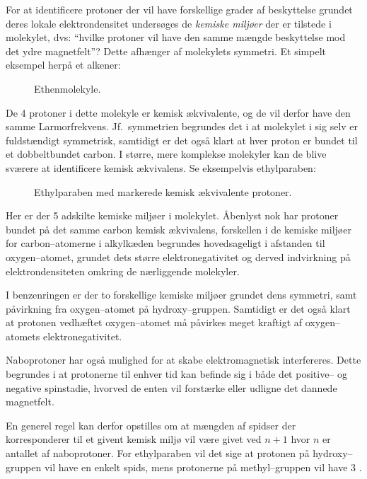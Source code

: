     For at identificere protoner der vil have forskellige grader af beskyttelse grundet deres lokale elektrondensitet undersøges de \textit{kemiske miljøer} der er tilstede i molekylet, dvs: ``hvilke protoner vil have den samme mængde beskyttelse mod det ydre magnetfelt''? Dette afhænger af molekylets symmetri. Et simpelt eksempel herpå et alkener:
    \begin{figure}[H]\centering
        \caption{Ethenmolekyle.}
    \end{figure}
    De 4 protoner i dette molekyle er kemisk ækvivalente, og de vil derfor have den samme Larmorfrekvens. Jf.\ symmetrien begrundes det i at molekylet i sig selv er fuldstændigt symmetrisk, samtidigt er det også klart at hver proton er bundet til et dobbeltbundet carbon. I større, mere komplekse molekyler kan de blive sværere at identificere kemisk ækvivalens. Se eksempelvis ethylparaben:
    \begin{figure}[H]\centering
        \caption{Ethylparaben med markerede kemisk ækvivalente protoner.}
    \end{figure}
    Her er der 5 adskilte kemiske miljøer i molekylet. Åbenlyst nok har protoner bundet på det samme carbon kemisk ækvivalens, forskellen i de kemiske miljøer for carbon--atomerne i alkylkæden begrundes hovedsageligt i afstanden til oxygen--atomet, grundet dets større elektronegativitet og derved indvirkning på elektrondensiteten omkring de nærliggende molekyler. 

    I benzenringen er der to forskellige kemiske miljøer grundet dens symmetri, samt påvirkning fra oxygen--atomet på hydroxy--gruppen. Samtidigt er det også klart at protonen vedhæftet oxygen--atomet må påvirkes meget kraftigt af oxygen--atomets elektronegativitet.

    Naboprotoner har også mulighed for at skabe elektromagnetisk interfereres. Dette begrundes i at protonerne til enhver tid kan befinde sig i både det positive-- og negative spinstadie, hvorved de enten vil forstærke eller udligne det dannede magnetfelt.

    En generel regel kan derfor opstilles om at mængden af spidser der korresponderer til et givent kemisk miljø vil være givet ved $n+1$ hvor  $n$ er antallet af naboprotoner. For ethylparaben vil det sige at protonen på hydroxy--gruppen vil have en enkelt spids, mens protonerne på methyl--gruppen vil have 3 \parencite{Nana2020}.

